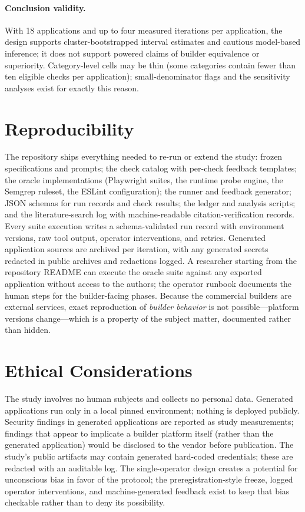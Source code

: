 \paragraph{Conclusion validity.} With 18 applications and up to four measured
iterations per application, the design supports cluster-bootstrapped interval
estimates and cautious model-based inference; it does not support powered claims of
builder equivalence or superiority. Category-level cells may be thin (some categories
contain fewer than ten eligible checks per application); small-denominator flags and
the sensitivity analyses exist for exactly this reason.

\section{Reproducibility}

The repository ships everything needed to re-run or extend the study: frozen
specifications and prompts; the check catalog with per-check feedback templates; the
oracle implementations (Playwright suites, the runtime probe engine, the Semgrep
ruleset, the ESLint configuration); the runner and feedback generator; JSON schemas
for run records and check results; the ledger and analysis scripts; and the
literature-search log with machine-readable citation-verification records. Every
suite execution writes a schema-validated run record with environment versions, raw
tool output, operator interventions, and retries. Generated application sources are
archived per iteration, with any generated secrets redacted in public archives and
redactions logged. A researcher starting from the repository README can execute the
oracle suite against any exported application without access to the authors; the
operator runbook documents the human steps for the builder-facing phases. Because
the commercial builders are external services, exact reproduction of \emph{builder
behavior} is not possible---platform versions change---which is a property of the
subject matter, documented rather than hidden.

\section{Ethical Considerations}

The study involves no human subjects and collects no personal data. Generated
applications run only in a local pinned environment; nothing is deployed publicly.
Security findings in generated applications are reported as study measurements;
findings that appear to implicate a builder platform itself (rather than the
generated application) would be disclosed to the vendor before publication. The
study's public artifacts may contain generated hard-coded credentials; these are
redacted with an auditable log. The single-operator design creates a potential for
unconscious bias in favor of the protocol; the preregistration-style freeze, logged
operator interventions, and machine-generated feedback exist to keep that bias
checkable rather than to deny its possibility.

